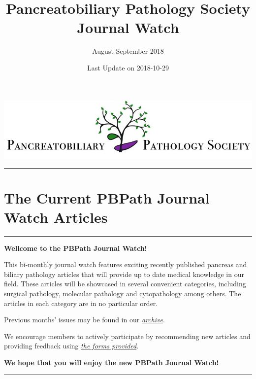 \documentclass[]{article}
\title{Pancreatobiliary Pathology Society Journal Watch}
\subtitle{August September 2018}
\author{}
\date{Last Update on 2018-10-29}
\begin{document}
\maketitle

{
\setcounter{tocdepth}{5}
\tableofcontents
}
\href{http://pbpath.org/}{\includegraphics{figures/PBP_header_logo.jpg}}

\begin{center}\rule{0.5\linewidth}{\linethickness}\end{center}

\hypertarget{the-current-pbpath-journal-watch-articles}{%
\section{The Current PBPath Journal Watch
Articles}\label{the-current-pbpath-journal-watch-articles}}

\begin{center}\rule{0.5\linewidth}{\linethickness}\end{center}

\textbf{Wellcome to the PBPath Journal Watch!}

This bi-monthly journal watch features exciting recently published
pancreas and biliary pathology articles that will provide up to date
medical knowledge in our field. These articles will be showcased in
several convenient categories, including surgical pathology, molecular
pathology and cytopathology among others. The articles in each category
are in no particular order.

Previous months' issues may be found in our
\emph{\href{http://pbpath.org/journal-watch-archive/}{archive}}.

We encourage members to actively participate by recommending new
articles and providing feedback using
\emph{\href{https://docs.google.com/forms/d/e/1FAIpQLSeD3Z9J6Y7eMmiyM12f_SfAmHUlykb1zxZcwO6lg7cebGYQIQ/viewform}{the
forms provided}}.

\textbf{We hope that you will enjoy the new PBPath Journal Watch!}

\begin{center}\rule{0.5\linewidth}{\linethickness}\end{center}
\end{document}
